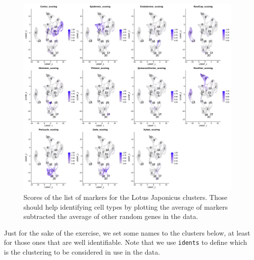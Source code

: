 \documentclass[
  letterpaper,
  DIV=11,
  numbers=noendperiod]{scrartcl}
\begin{document}
\begin{figure}[H]

{\centering \includegraphics{notebook_files/figure-pdf/fig-scores-output-1.png}

}

\caption{\label{fig-scores}Scores of the list of markers for the Lotus
Japonicus clusters. Those should help identifying cell types by plotting
the average of markers subtracted the average of other random genes in
the data.}

\end{figure}

Just for the sake of the exercise, we set some names to the clusters
below, at least for those ones that are well identifiable. Note that we
use \texttt{idents} to define which is the clustering to be considered
in use in the data.
\end{document}
